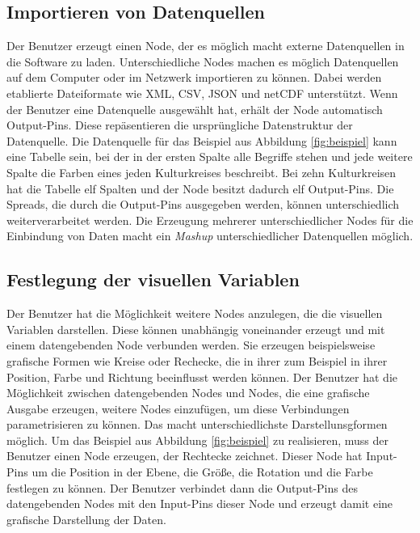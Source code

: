 \documentclass[a4paper, 
               12pt,
               DIV=calc,
               version=first,
               pdftex,
               headsepline,
               footsepline,
               bibtotocnumbered,
               liststotocnumbered]{scrreprt}
\begin{document}
\subsection{Importieren von Datenquellen}
Der Benutzer erzeugt einen Node, der es möglich macht externe Datenquellen
in die Software zu laden. Unterschiedliche Nodes machen es möglich Datenquellen auf
dem Computer oder im Netzwerk importieren zu können. Dabei werden etablierte
Dateiformate wie XML, CSV, JSON und netCDF unterstützt. Wenn der Benutzer eine 
Datenquelle ausgewählt hat, erhält der Node automatisch Output-Pins.
Diese repäsentieren die ursprüngliche Datenstruktur der Datenquelle.
Die Datenquelle für das Beispiel aus Abbildung \ref{fig:beispiel} kann eine Tabelle sein,
bei der in der ersten Spalte alle Begriffe stehen und jede weitere Spalte die Farben
eines jeden Kulturkreises beschreibt. Bei zehn Kulturkreisen hat die Tabelle
elf Spalten und der Node besitzt dadurch elf Output-Pins. Die Spreads, die durch
die Output-Pins ausgegeben werden, können unterschiedlich
weiterverarbeitet werden.
Die Erzeugung mehrerer unterschiedlicher Nodes für die Einbindung von Daten macht ein
\textit{Mashup} unterschiedlicher Datenquellen möglich.
\subsection{Festlegung der visuellen Variablen}
Der Benutzer hat die Möglichkeit weitere Nodes anzulegen, die die visuellen
Variablen darstellen. Diese können unabhängig voneinander erzeugt und mit einem datengebenden
Node verbunden werden. Sie erzeugen beispielsweise grafische Formen wie Kreise oder Rechecke,
die in ihrer zum Beispiel in ihrer Position, Farbe und Richtung beeinflusst werden können.
Der Benutzer hat die Möglichkeit zwischen datengebenden Nodes und
Nodes, die eine grafische Ausgabe erzeugen, weitere Nodes einzufügen, um diese Verbindungen
parametrisieren zu können. Das macht unterschiedlichste Darstellunsgformen möglich.
Um das Beispiel aus Abbildung \ref{fig:beispiel} zu realisieren, muss der Benutzer einen
Node erzeugen, der Rechtecke zeichnet. Dieser Node hat Input-Pins um die Position
in der Ebene, die Größe, die Rotation und die Farbe festlegen zu können. Der Benutzer
verbindet dann die Output-Pins des datengebenden Nodes mit den Input-Pins dieser Node
und erzeugt damit eine grafische Darstellung der Daten.
\end{document}
